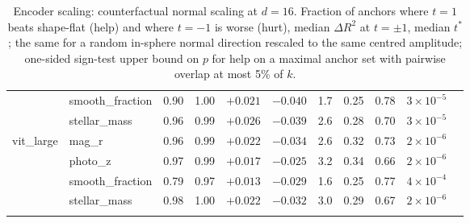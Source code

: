 \begin{table}[t]
\begin{tabular}{llccccccccc}
 & smooth\_fraction & 0.90 & 1.00 & $+0.021$ & $-0.040$ & 1.7 & 0.25 & 0.78 & $3\times 10^{-5}$ \\
 & stellar\_mass & 0.96 & 0.99 & $+0.026$ & $-0.039$ & 2.6 & 0.28 & 0.70 & $3\times 10^{-5}$ \\
\addlinespace[2pt]
vit\_large & mag\_r & 0.96 & 0.99 & $+0.022$ & $-0.034$ & 2.6 & 0.32 & 0.73 & $2\times 10^{-6}$ \\
 & photo\_z & 0.97 & 0.99 & $+0.017$ & $-0.025$ & 3.2 & 0.34 & 0.66 & $2\times 10^{-6}$ \\
 & smooth\_fraction & 0.79 & 0.97 & $+0.013$ & $-0.029$ & 1.6 & 0.25 & 0.77 & $4\times 10^{-4}$ \\
 & stellar\_mass & 0.98 & 1.00 & $+0.022$ & $-0.032$ & 3.0 & 0.29 & 0.67 & $2\times 10^{-6}$ \\
\addlinespace[2pt]
\bottomrule
\end{tabular}
\caption{Encoder scaling: counterfactual normal scaling at $d=16$. Fraction of anchors where $t=1$ beats shape-flat (help) and where $t=-1$ is worse (hurt), median $\Delta R^2$ at $t=\pm1$, median $t^{*}$; the same for a random in-sphere normal direction rescaled to the same centred amplitude; one-sided sign-test upper bound on $p$ for help on a maximal anchor set with pairwise overlap at most 5\% of $k$.}
\label{tab:scaling_cf}
\end{table}
